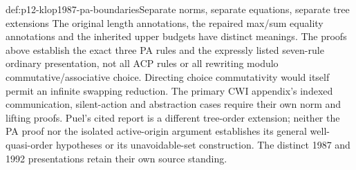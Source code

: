 \begin{proofboundary}{def:p12-klop1987-pa-boundaries}{Separate norms, separate equations, separate tree extensions}
The original length annotations, the repaired max/sum equality
annotations and the inherited upper budgets have distinct meanings.
The proofs above establish the exact three PA rules and the expressly
listed seven-rule ordinary presentation, not all ACP rules or all
rewriting modulo commutative/associative choice. Directing choice
commutativity would itself permit an infinite swapping reduction.
The primary CWI appendix's indexed communication, silent-action and
abstraction cases require their own norm and lifting proofs.
Puel's cited report is a different tree-order extension; neither
the PA proof nor the isolated active-origin argument establishes its
general well-quasi-order hypotheses or its unavoidable-set construction.
The distinct 1987 and 1992 presentations retain their own source standing.
\end{proofboundary}
